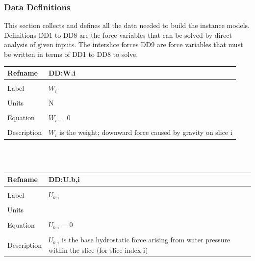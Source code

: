 \documentclass[12pt]{article}
\begin{document}
\subsubsection{Data Definitions}
\label{Sec:DataDefi}
This section collects and defines all the data needed to build the instance models. Definitions DD1 to DD8 are the force variables that can be solved by direct analysis of given inputs. The interslice forces DD9 are force variables that must be written in terms of DD1 to DD8 to solve.
~\newline
\noindent \begin{minipage}{\textwidth}
\begin{tabular}{p{} p{}}
\toprule \textbf{Refname} & \textbf{DD:W.i}
\label{DD:W.i}
\\ \midrule \\
Label & $W_{i}$
\\ \midrule \\
Units & N
\\ \midrule \\
Equation & $W_{i}$ = $0$
\\ \midrule \\
Description & $W_{i}$ is the weight; downward force caused by gravity on slice i
\\ \bottomrule \end{tabular}
\end{minipage}\\
~\newline
\noindent \begin{minipage}{\textwidth}
\begin{tabular}{p{} p{}}
\toprule \textbf{Refname} & \textbf{DD:U.b,i}
\label{DD:U.b,i}
\\ \midrule \\
Label & $U_{b,i}$
\\ \midrule \\
Units & 
\\ \midrule \\
Equation & $U_{b,i}$ = $0$
\\ \midrule \\
Description & $U_{b,i}$ is the base hydrostatic force arising from water pressure within the slice (for slice index i)
\\ \bottomrule \end{tabular}
\end{minipage}\\
~\newline
\end{document}
